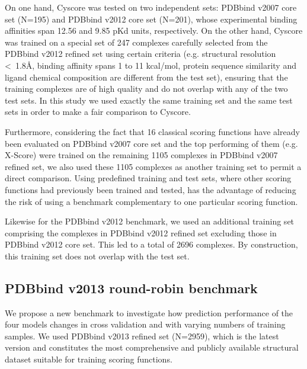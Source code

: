 On one hand, Cyscore was tested on two independent sets: PDBbind v2007 core set (N=195) and PDBbind v2012 core set (N=201), whose experimental binding affinities span 12.56 and 9.85 pKd units, respectively. On the other hand, Cyscore was trained on a special set of 247 complexes carefully selected from the PDBbind v2012 refined set using certain criteria \citep{1372} (e.g. structural resolution \textless\ 1.8\AA, binding affinity spans 1 to 11 kcal/mol, protein sequence similarity and ligand chemical composition are different from the test set), ensuring that the training complexes are of high quality and do not overlap with any of the two test sets. In this study we used exactly the same training set and the same test sets in order to make a fair comparison to Cyscore.

Furthermore, considering the fact that 16 classical scoring functions have already been evaluated \citep{1313} on PDBbind v2007 core set and the top performing of them (e.g. X-Score) were trained on the remaining 1105 complexes in PDBbind v2007 refined set, we also used these 1105 complexes as another training set to permit a direct comparison. Using predefined training and test sets, where other scoring functions had previously been trained and tested, has the advantage of reducing the risk of using a benchmark complementary to one particular scoring function.

Likewise for the PDBbind v2012 benchmark, we used an additional training set comprising the complexes in PDBbind v2012 refined set excluding those in PDBbind v2012 core set. This led to a total of 2696 complexes. By construction, this training set does not overlap with the test set. %

\subsection{PDBbind v2013 round-robin benchmark}

We propose a new benchmark to investigate how prediction performance of the four models changes in cross validation and with varying numbers of training samples. We used PDBbind v2013 refined set (N=2959), which is the latest version and constitutes the most comprehensive and publicly available structural dataset suitable for training scoring functions.

